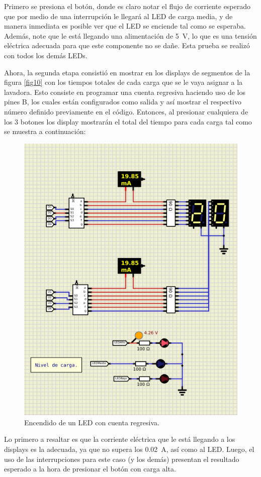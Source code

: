 Primero se presiona el botón, donde es claro notar el flujo de corriente esperado que por medio de una interrupción le llegará al LED de carga media, y de manera inmediata es posible ver que el LED se enciende tal como se esperaba. Además, note que le está llegando una alimentación de \SI{5}{\volt}, lo que es una tensión eléctrica adecuada para que este componente no se dañe. Esta prueba se realizó con todos los demás LEDs. \par
Ahora, la segunda etapa consistió en mostrar en los displays de segmentos de la figura \ref{fig10} con los tiempos totales de cada carga que se le vaya asignar a la lavadora. Esto consiste en programar una cuenta regresiva haciendo uso de los pines B, los cuales están configurados como salida y así mostrar el respectivo número definido previamente en el código. Entonces, al presionar cualquiera de los 3 botones los display mostrarán el total del tiempo para cada carga tal como se muestra a continuación:
\begin{figure}[H]
        \centering
        \includegraphics[width=.7\linewidth]{Imagenes/8.png}
        \caption{Encendido de un LED con cuenta regresiva.}
        \label{fig14}
    \end{figure}
Lo primero a resaltar es que la corriente eléctrica que le está llegando a los displays es la adecuada, ya que no supera los \SI{0.02}{\A}, así como al LED. Luego, el uso de las interrupciones para este caso (y los demás) presentan el resultado esperado a la hora de presionar el botón con carga alta.\par



































\newpage